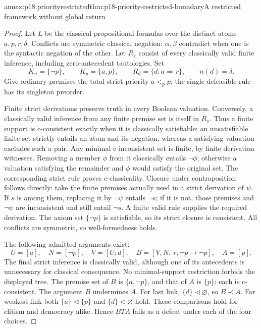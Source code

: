 \begin{annexitem}{annex:p18.priorityrestricted}{thm:p18-priority-restricted-boundary}{A restricted framework without global return}
\begin{proof}
Let \(L\) be the classical propositional formulas over the distinct atoms
\(a,p,r,\delta\). Conflicts are symmetric classical negation:
\(\alpha,\beta\) contradict when one is the syntactic negation of the
other. Let \(R_s\) consist of every classically valid finite inference,
including zero-antecedent tautologies. Set
\[
 K_n=\{\neg p\},\qquad K_p=\{a,p\},\qquad
 R_d=\{d:a\Rightarrow r\},\qquad n(d)=\delta .
 \tag{7}
\]
Give ordinary premises the total strict priority \(a<_p p\);
the single defeasible rule has its singleton preorder.

Finite strict derivations preserve truth in every Boolean valuation.
Conversely, a classically valid inference from any finite premise set
is itself in \(R_s\).
Thus a finite support is c-consistent exactly when it is classically
satisfiable: an unsatisfiable finite set strictly entails an atom and
its negation, whereas a satisfying valuation excludes such a pair.
Any minimal c-inconsistent set is finite, by finite derivation witnesses.
Removing a member \(\phi\) from it classically entails \(\neg\phi\);
otherwise a valuation satisfying the remainder and \(\phi\) would
satisfy the original set. The corresponding strict rule proves
c-classicality.
Closure under contraposition follows directly: take the finite premises
actually used in a strict derivation of \(\psi\). If \(s\) is among
them, replacing it by \(\neg\psi\) entails \(\neg s\); if it is not,
those premises and \(\neg\psi\) are inconsistent and still entail
\(\neg s\). A finite valid rule supplies the required derivation.
The axiom set \(\{\neg p\}\) is satisfiable, so its strict closure is
consistent. All conflicts are symmetric, so well-formedness holds.

The following admitted arguments exist:
\[
 U=[a],\quad N=[\neg p],\quad V=[U;d],\quad
 B=[V,N;\ r,\neg p\to\neg p],\quad A=[p].
 \tag{8}
\]
The final strict inference is classically valid, although one of its
antecedents is unnecessary for classical consequence. No minimal-support
restriction forbids the displayed tree.
The premise set of \(B\) is \(\{a,\neg p\}\), and that of \(A\)
is \(\{p\}\); each is c-consistent.
The argument \(B\) undermines \(A\).
For last link, \(\{d\}\triangleleft\varnothing\), so \(B\prec A\).
For weakest link both
\(\{a\}\triangleleft\{p\}\) and
\(\{d\}\triangleleft\varnothing\) hold.
These comparisons hold for elitism and democracy alike.
Hence \(B T A\) fails as a defeat under each of the four choices.


\end{proof}
\end{annexitem}
